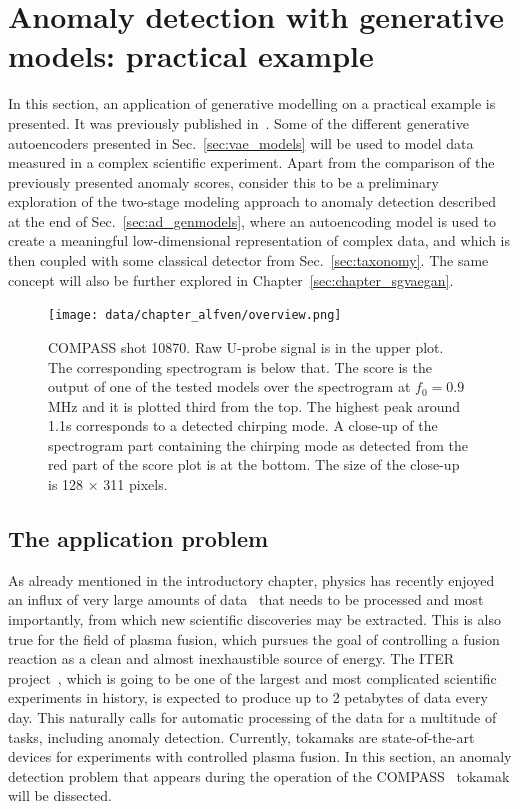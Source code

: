 \section{Anomaly detection with generative models: practical example} \label{sec:alfven}
In this section, an application of generative modelling on a practical example is presented. It was previously published in~\cite{vskvara2020detection}. Some of the different generative autoencoders presented in Sec.~\ref{sec:vae_models} will be used to model data measured in a complex scientific experiment. Apart from the comparison of the previously presented anomaly scores, consider this to be a preliminary exploration of the two-stage modeling approach to anomaly detection described at the end of Sec.~\ref{sec:ad_genmodels}, where an autoencoding model is used to create a meaningful low-dimensional representation of complex data, and which is then coupled with some classical detector from Sec.~\ref{sec:taxonomy}. The same concept will also be further explored in Chapter~\ref{sec:chapter_sgvaegan}.

\begin{figure}[t]%
  \centering
  \texttt{[image: data/chapter\_alfven/overview.png]}
  \caption{COMPASS shot 10870. Raw U-probe signal is in the upper plot. The corresponding spectrogram is below that. The score is the output of one of the tested models over the spectrogram at $f_0=0.9$ MHz and it is plotted third from the top. The highest peak around 1.1s corresponds to a detected chirping mode. A close-up of the spectrogram part containing the chirping mode as detected from the red part of the score plot is at the bottom. The size of the close-up is 128 $\times$ 311 pixels.}
  \label{fig:psd}
\end{figure}

\subsection{The application problem}
As already mentioned in the introductory chapter, physics has recently enjoyed an influx of very large amounts of data~\cite{bird2011computing,ball2010data} that needs to be processed and most importantly, from which new scientific discoveries may be extracted. This is also true for the field of plasma fusion, which pursues the goal of controlling a fusion reaction as a clean and almost inexhaustible source of energy. The ITER project~\cite{holtkamp2007overview}, which is going to be one of the largest and most complicated scientific experiments in history, is expected to produce up to 2 petabytes of data every day. This naturally calls for automatic processing of the data for a multitude of tasks, including anomaly detection. Currently, tokamaks are state-of-the-art devices for experiments with controlled plasma fusion. In this section, an anomaly detection problem that appears during the operation of the COMPASS~\cite{panek2015status} tokamak will be dissected.

